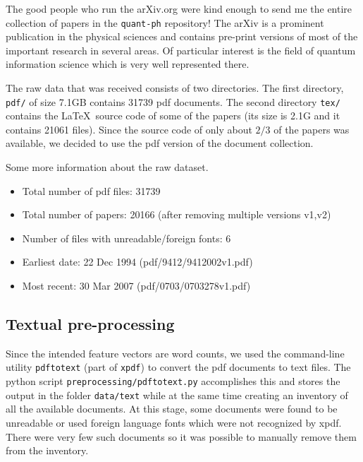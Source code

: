 \documentclass[11pt]{article}
\newcommand{\file}[1]{\texttt{#1}}
\newcommand{\program}[1]{\texttt{#1}}
\begin{document}
	The good people who run the arXiv.org were kind enough to send me the entire collection of papers
	in the \texttt{quant-ph} repository! 
    The arXiv is a prominent publication in the physical sciences and contains pre-print versions
    of most of the important research in several areas.
    Of particular interest is the field of quantum information science which is very well
    represented there.
	
    The raw data that was received consists of two directories. 
    The first directory, \file{pdf/} of size 7.1GB contains 31739 pdf documents.
    The second directory \file{tex/}  contains the \LaTeX \ source code of some of the papers 
    (its size is 2.1G and it contains 21061 files). 
    Since the source code of only about $2/3$ of the papers was available, we decided to use 
    the pdf version of the document collection.

        
        
	Some more information about the raw dataset.
	\begin{itemize}
		\item Total number of pdf files: 31739
        \item Total number of papers: 20166 (after removing multiple versions v1,v2)
        \item Number of files with unreadable/foreign fonts: 6
		\item Earliest date: 22 Dec 1994  (pdf/9412/9412002v1.pdf)
		\item Most recent:  30 Mar 2007 (pdf/0703/0703278v1.pdf)
	\end{itemize}
	
	
	
	\subsection{Textual pre-processing}

        Since the intended feature vectors are word counts, we used the command-line utility
        \texttt{pdftotext} (part of \program{xpdf}) to convert the pdf documents to text files.
        The python script \file{preprocessing/pdftotext.py} accomplishes this and stores the
        output in the folder \file{data/text} while at the same time creating an inventory of
        all the available documents.
        At this stage, some documents were found to be unreadable or used foreign language fonts
        which were not recognized by xpdf. There were very few such documents so it was possible
        to manually remove them from the inventory.
\end{document}
